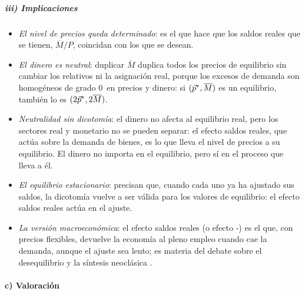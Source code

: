 \documentclass[11pt]{article}
\begin{document}
\subparagraph{iii) Implicaciones}

\begin{itemize}
\item \emph{El nivel de precios queda determinado}: es el que hace que los saldos reales que se tienen, $\overline{M}/P$, coincidan con los que se desean.
\item \emph{El dinero es neutral}: duplicar $\overline{M}$ duplica todos los precios de equilibrio sin cambiar los relativos ni la asignación real, porque los excesos de demanda son homogéneos de grado 0~en precios y dinero: si $(\vec{p}^*,\overline{M})$ es un equilibrio, también lo es $(2\vec{p}^*,2\overline{M})$.
\item \emph{Neutralidad sin dicotomía}: el dinero no afecta al equilibrio real, pero los sectores real y monetario no se pueden separar: el efecto saldos reales, que actúa sobre la demanda de bienes, es lo que lleva el nivel de precios a su equilibrio. El dinero no importa en el equilibrio, pero sí en el proceso que lleva a él.
\item \emph{El equilibrio estacionario}: \textcite{ArchibaldLipsey1958Monetary} precisan que, cuando cada uno ya ha ajustado sus saldos, la dicotomía vuelve a ser válida para los valores de equilibrio: el efecto saldos reales actúa en el ajuste.
\item \emph{La versión macroeconómica}: el efecto saldos reales (o efecto -) es el que, con precios flexibles, devuelve la economía al pleno empleo cuando cae la demanda, aunque el ajuste sea lento; es materia del debate sobre el desequilibrio y la síntesis neoclásica  .
\end{itemize}

\paragraph{c) Valoración}
\end{document}
